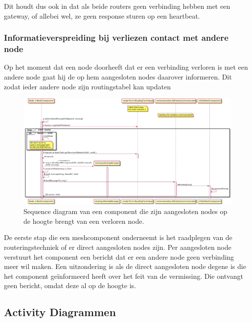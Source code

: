 \documentclass[a4paper, 11pt, oneside]{report}
\begin{document}
Dit houdt dus ook in dat als beide routers geen verbinding hebben met een gateway, of allebei wel, ze geen response sturen op een heartbeat.

\subsubsection{Informatieverspreiding bij verliezen contact met andere node}
\label{DetailedDesign:Communicatie:sequence:contactverlies}
Op het moment dat een node doorheeft dat er een verbinding verloren is met een andere node gaat hij de op hem aangesloten nodes daarover informeren. Dit zodat ieder andere node zijn routingstabel kan updaten 
\begin{figure}[H]
	\begin{center}\includegraphics[width=\linewidth]{UML/out/Communication/Sequence/LostConnectionWithOther/LostConnectionWithOther.png}\end{center}
	\caption{Sequence diagram van een component die zijn aangesloten nodes op de hoogte brengt van een verloren node.}
	\label{fig:communication:sequence:contactverlies}
\end{figure}

De eerste stap die een meshcomponent onderneemt is het raadplegen van de routeringstechniek of er direct aangesloten nodes zijn.
Per aangesloten node verstuurt het component een bericht dat er een andere node geen verbinding meer wil maken.
Een uitzondering is als de direct aangesloten node degene is die het component geïnformeerd heeft over het feit van de vermissing.
Die ontvangt geen bericht, omdat deze al op de hoogte is.


\subsection{Activity Diagrammen}
\label{DetailedDesign:Communicatie:Activity}
\end{document}
